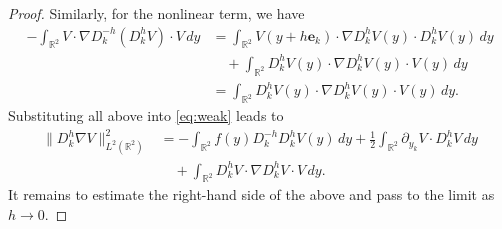 \documentclass[12pt]{amsart}
\numberwithin{equation}{section}              %
\theoremstyle{remark}
\begin{document}
\begin{proof}
			Similarly, for the nonlinear term, we have
			\begin{equation*}
				\begin{aligned}
					-\int_{\mathbb{R}^{2}} V\cdot \nabla D_{k}^{-h}(D_{k}^{h}V) \cdot V \, dy &= \int_{\mathbb{R}^{2}} V(y + h\mathbf{e}_{k}) \cdot \nabla D_{k}^{h}V(y) \cdot D_{k}^{h}V(y) \, dy \\
					&\quad + \int_{\mathbb{R}^{2}} D_{k}^{h} V(y) \cdot \nabla D_{k}^{h}V(y) \cdot V(y) \, dy \\
					&= \int_{\mathbb{R}^{2}} D_{k}^{h} V(y) \cdot \nabla D_{k}^{h}V(y) \cdot V(y) \, dy.
				\end{aligned}
			\end{equation*}
			Substituting all above into \eqref{eq:weak} leads to
			\begin{equation}\label{eq:eneridt}
				\begin{aligned}
					\|D_{k}^{h}\nabla V\|_{L^{2}(\mathbb{R}^{2})}^{2} &= -\int_{\mathbb{R}^{2}} f(y) D_{k}^{-h}D_{k}^{h}V(y) \, dy + \frac{1}{2} \int_{\mathbb{R}^{2}} \partial_{y_{k}}V \cdot D_{k}^{h}V \, dy \\
					&\quad + \int_{\mathbb{R}^{2}} D_{k}^{h} V \cdot \nabla D_{k}^{h}V \cdot V \, dy.
				\end{aligned}
			\end{equation}
			It remains to estimate the right-hand side of the above and pass to the limit as $h \to 0$. 
			

\end{proof}
\end{document}
